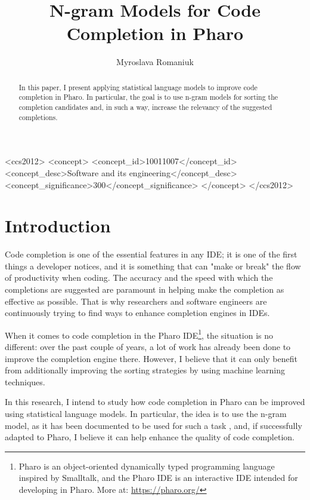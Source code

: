 \documentclass[sigconf,screen]{acmart}
\begin{document}
\title{N-gram Models for Code Completion in Pharo}
\author{Myroslava Romaniuk}
\begin{abstract}
In this paper, I present applying statistical language models to improve code completion in Pharo. In particular, the goal is to use n-gram models for sorting the completion candidates and, in such a way, increase the relevancy of the suggested completions.
\end{abstract}

\begin{CCSXML}
<ccs2012>
<concept>
<concept_id>10011007</concept_id>
<concept_desc>Software and its engineering</concept_desc>
<concept_significance>300</concept_significance>
</concept>
</ccs2012>
\end{CCSXML}


\maketitle

\section{Introduction}
Code completion is one of the essential features in any IDE; it is one of the first things a developer notices, and it is something that can "make or break" the flow of productivity when coding. The accuracy and the speed with which the completions are suggested are paramount in helping make the completion as effective as possible. That is why researchers and software engineers are continuously trying to find ways to enhance completion engines in IDEs.

When it comes to code completion in the Pharo IDE\footnote{Pharo is an object-oriented dynamically typed programming language inspired by Smalltalk, and the Pharo IDE is an interactive IDE intended for developing in Pharo. More at: \url{https://pharo.org/}}, the situation is no different: over the past couple of years, a lot of work has already been done to improve the completion engine there. However, I believe that it can only benefit from additionally improving the sorting strategies by using machine learning techniques.

In this research, I intend to study how code completion in Pharo can be improved using statistical language models. In particular, the idea is to use the n-gram model, as it has been documented to be used for such a task \cite{Hind12a}, and, if successfully adapted to Pharo, I believe it can help enhance the quality of code completion.
\end{document}
